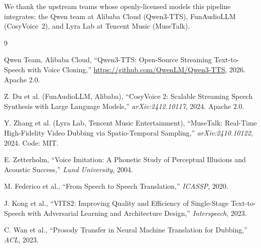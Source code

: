 \documentclass[11pt,a4paper]{article}
\begin{document}
We thank the upstream teams whose openly-licensed models this pipeline integrates: the
Qwen team at Alibaba Cloud (Qwen3-TTS), FunAudioLLM (CosyVoice~2), and Lyra Lab at
Tencent Music (MuseTalk).


\begin{thebibliography}{9}

Qwen Team, Alibaba Cloud,
``Qwen3-TTS: Open-Source Streaming Text-to-Speech with Voice Cloning,''
\url{https://github.com/QwenLM/Qwen3-TTS}, 2026. Apache 2.0.

Z. Du et al. (FunAudioLLM, Alibaba),
``CosyVoice 2: Scalable Streaming Speech Synthesis with Large Language Models,''
\textit{arXiv:2412.10117}, 2024. Apache 2.0.

Y. Zhang et al. (Lyra Lab, Tencent Music Entertainment),
``MuseTalk: Real-Time High-Fidelity Video Dubbing via Spatio-Temporal Sampling,''
\textit{arXiv:2410.10122}, 2024. Code: MIT.

E. Zetterholm,
``Voice Imitation: A Phonetic Study of Perceptual Illusions and Acoustic Success,''
\textit{Lund University}, 2004.

M. Federico et al.,
``From Speech to Speech Translation,''
\textit{ICASSP}, 2020.

J. Kong et al.,
``VITS2: Improving Quality and Efficiency of Single-Stage Text-to-Speech with Adversarial Learning and Architecture Design,''
\textit{Interspeech}, 2023.

C. Wan et al.,
``Prosody Transfer in Neural Machine Translation for Dubbing,''
\textit{ACL}, 2023.

\end{thebibliography}
\end{document}
